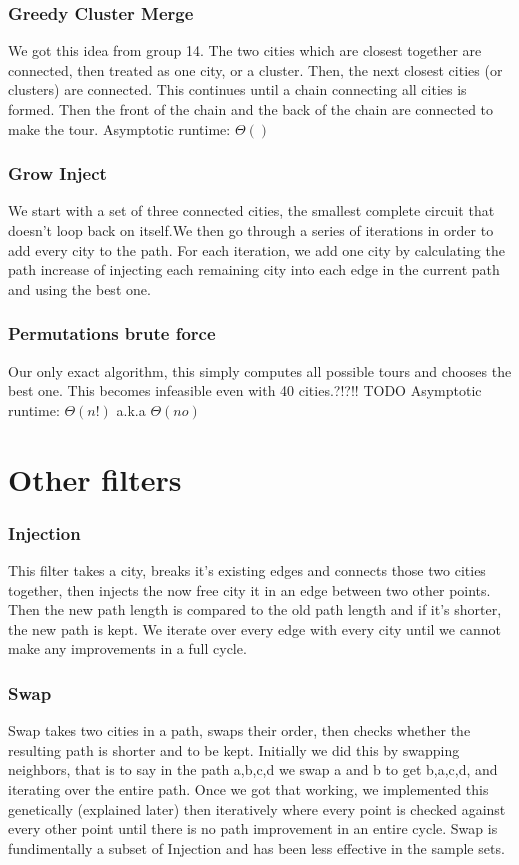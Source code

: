 \documentclass{article}
\begin{document}
\section*{Greedy Cluster Merge}%
We got this idea from group 14. The two cities which are closest together are connected, then treated as one city, or a cluster. Then, the next closest cities (or clusters) are connected. This continues until a chain connecting all cities is formed. Then the front of the chain and the back of the chain are connected to make the tour. Asymptotic runtime: $\Theta ()$

\section*{Grow Inject}%
We start with a set of three connected cities, the smallest complete circuit that doesn't loop back on itself.We then go through a series of iterations in order to add every city to the path. For each iteration, we add one city by calculating the path increase of injecting each remaining city into each edge in the current path and using the best one.

\section*{Permutations brute force}%
Our only exact algorithm, this simply computes all possible tours and chooses the best one. This becomes infeasible even with 40 cities.?!?!! TODO Asymptotic runtime: $\Theta (n!)$ a.k.a $\Theta (no)$

\part*{Other filters}

\section*{Injection}%
This filter takes a city, breaks it's existing edges and connects those two cities together, then injects the now free city it in an edge between two other points. Then the new path length is compared to the old path length and if it's shorter, the new path is kept. We iterate over every edge with every city until we cannot make any improvements in a full cycle.

\section*{Swap}%
Swap takes two cities in a path, swaps their order, then checks whether the resulting path is shorter and to be kept. Initially we did this by swapping neighbors, that is to say in the path a,b,c,d we swap a and b to get b,a,c,d, and iterating over the entire path. Once we got that working, we implemented this genetically (explained later) then iteratively where every point is checked against every other point until there is no path improvement in an entire cycle. Swap is fundimentally a subset of Injection and has been less effective in the sample sets.
\end{document}
